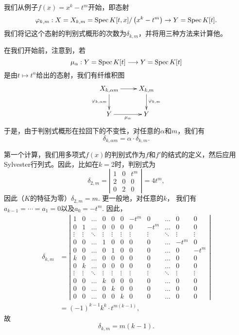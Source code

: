 \begin{exa}\label{exa:5.26}
我们从例子$f(x)=x^k-t^m$开始，即态射
\[
    \varphi_{k, m}: X=X_{k, m}=\operatorname{Spec} K[t, x] /\left(x^k-t^m\right) \rightarrow Y=\operatorname{Spec} K[t].
\]
我们将记这个态射的判别式概形的次数为$\delta_{k,m}$，并将用三种方法来计算他。

在我们开始前，注意到，若
\[
    \mu_\alpha: Y=\operatorname{Spec} K[t] \longrightarrow Y=\operatorname{Spec} K[t]
\]
是由$t\mapsto t^\alpha$给出的态射，我们有纤维积图
\[
    \xymatrix{
        X_{k,\alpha m}\ar[r]\ar[d]_{\varphi_{k,\alpha m}}& X_{k,m}\ar[d]^{\varphi_{k, m}}\\
        Y\ar[r]_{\mu_\alpha}& Y
    }
\]
于是，由于判别式概形在拉回下的不变性，对任意的$\alpha$和$m$，我们有
\[
    \delta_{k, \alpha m}=\alpha \cdot \delta_{k, m}.
\]

第一个计算，我们用多项式$f(x)$的判别式作为$f$和$f'$的结式的定义，然后应用
Sylvester行列式。因此，比如在$k=2$时，判别式为
\[
    \delta_{2, m}=\left|\begin{array}{ccc}
        1 & 0 & t^m \\
        2 & 0 & 0 \\
        0 & 2 & 0
    \end{array}\right|=4 t^m,
\]
因此（$K$的特征为零）$\delta_{2,m}=m$. 更一般地，对任意的$k$，
我们有$a_{k-1}=\cdots=a_1=0$以及$a_0=-t^m$. 因此，
\[
    \begin{aligned}
        \delta_{k, m} & =\left|\begin{array}{ccccccccccc}
        1 & 0 & \ldots & 0 & 0 & 0 & -t^m & 0 & \ldots & 0 & 0 \\
        0 & 1 & \ldots & 0 & 0 & 0 & 0 & -t^m & \ldots & 0 & 0 \\
        \vdots & \vdots & \ddots & \vdots & \vdots & \vdots & \vdots & \vdots & \ddots & \vdots & \vdots \\
        0 & 0 & \ldots & 1 & 0 & 0 & 0 & 0 & \ldots & -t^m & 0 \\
        0 & 0 & \ldots & 0 & 1 & 0 & 0 & 0 & \ldots & 0 & -t^m \\
        k & 0 & \ldots & 0 & 0 & 0 & 0 & 0 & \ldots & 0 & 0 \\
        0 & k & \ldots & 0 & 0 & 0 & 0 & 0 & \ldots & 0 & 0 \\
        \vdots & \vdots & \ddots & \vdots & \vdots & \vdots & \vdots & \vdots & \ddots & \vdots & \vdots \\
        0 & 0 & \ldots & k & 0 & 0 & 0 & 0 & \ldots & 0 & 0 \\
        0 & 0 & \ldots & 0 & k & 0 & 0 & 0 & \ldots & 0 & 0 \\
        0 & 0 & \ldots & 0 & 0 & k & 0 & 0 & \ldots & 0 & 0
        \end{array}\right| \\
        & =(-1)^{k-1} k^k \cdot t^{m(k-1)},
        \end{aligned}
\]
故
\[
    \delta_{k, m}=m(k-1).
\]


\end{exa}
